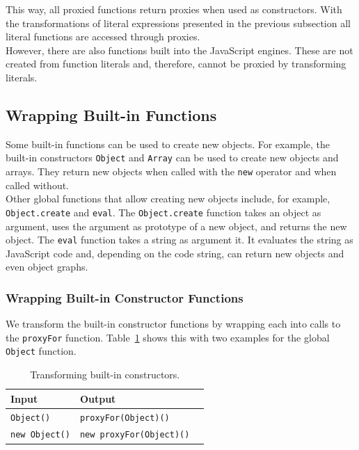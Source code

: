 This way, all proxied functions return proxies when used as constructors.
With the transformations of literal expressions presented in the previous subsection all literal functions are accessed through proxies.\\
However, there are also functions built into the JavaScript engines.
These are not created from function literals and, therefore, cannot be proxied by transforming literals.


\subsection{Wrapping Built-in Functions}

Some built-in functions can be used to create new objects.
For example, the built-in constructors \lstinline{Object} and \lstinline{Array} can be used to create new objects and arrays.
They return new objects when called with the \lstinline{new} operator and when called without.\\
Other global functions that allow creating new objects include, for example, \lstinline{Object.create} and \lstinline{eval}.
The \lstinline{Object.create} function takes an object as argument, uses the argument as prototype of a new object, and returns the new object.
The \lstinline{eval} function takes a string as argument it.
It evaluates the string as JavaScript code and, depending on the code string, can return new objects and even object graphs.


\subsubsection{Wrapping Built-in Constructor Functions}

We transform the built-in constructor functions by wrapping each into calls to the \lstinline{proxyFor} function.
Table~\ref{table:transformingBuiltInConstructors} shows this with two examples for the global \lstinline{Object} function.

\begin{table}[h]
\begin{center}
\begin{tabular}{| l | l | l |}
\hline
Input & Output \\ \hline
\lstinline|Object()| & \lstinline|proxyFor(Object)()| \\ \hline
\lstinline|new Object()| & \lstinline|new proxyFor(Object)()| \\ \hline
\end{tabular}
\end{center}
\caption[Table caption text]{Transforming built-in constructors.}
\label{table:transformingBuiltInConstructors}
\end{table}


